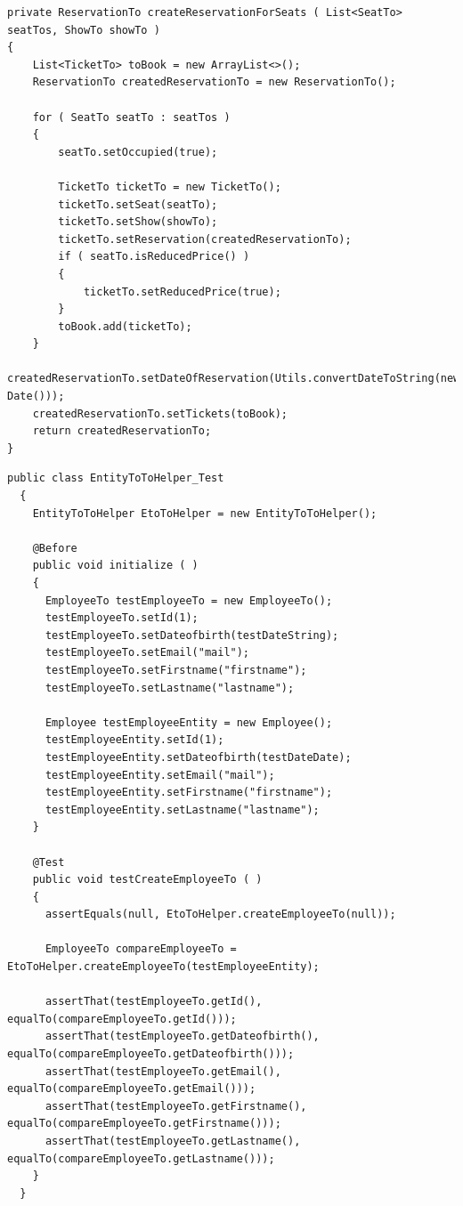 \begin{minipage}{\linewidth}
\begin{lstlisting}[style=lstJava]
private ReservationTo createReservationForSeats ( List<SeatTo> seatTos, ShowTo showTo )
{
	List<TicketTo> toBook = new ArrayList<>();
	ReservationTo createdReservationTo = new ReservationTo();
		
	for ( SeatTo seatTo : seatTos )
	{
		seatTo.setOccupied(true);
	
		TicketTo ticketTo = new TicketTo();
		ticketTo.setSeat(seatTo);
		ticketTo.setShow(showTo);
		ticketTo.setReservation(createdReservationTo);
		if ( seatTo.isReducedPrice() )
		{
			ticketTo.setReducedPrice(true);
		}
		toBook.add(ticketTo);
	}
	createdReservationTo.setDateOfReservation(Utils.convertDateToString(new Date()));
	createdReservationTo.setTickets(toBook);
	return createdReservationTo;
}
	\end{lstlisting}
	\label{lst:Anhang_Erstellen_Reservierung}
\end{minipage}

\begin{minipage}{\linewidth}
  \begin{lstlisting}[style=lstJava]
  public class EntityToToHelper_Test
  {
    EntityToToHelper EtoToHelper = new EntityToToHelper();

    @Before
    public void initialize ( )
    {
      EmployeeTo testEmployeeTo = new EmployeeTo();
      testEmployeeTo.setId(1);
      testEmployeeTo.setDateofbirth(testDateString);
      testEmployeeTo.setEmail("mail");
      testEmployeeTo.setFirstname("firstname");
      testEmployeeTo.setLastname("lastname");

      Employee testEmployeeEntity = new Employee();
      testEmployeeEntity.setId(1);
      testEmployeeEntity.setDateofbirth(testDateDate);
      testEmployeeEntity.setEmail("mail");
      testEmployeeEntity.setFirstname("firstname");
      testEmployeeEntity.setLastname("lastname");
    }

    @Test
    public void testCreateEmployeeTo ( )
    {
      assertEquals(null, EtoToHelper.createEmployeeTo(null));

      EmployeeTo compareEmployeeTo = EtoToHelper.createEmployeeTo(testEmployeeEntity);

      assertThat(testEmployeeTo.getId(), equalTo(compareEmployeeTo.getId()));
      assertThat(testEmployeeTo.getDateofbirth(), equalTo(compareEmployeeTo.getDateofbirth()));
      assertThat(testEmployeeTo.getEmail(), equalTo(compareEmployeeTo.getEmail()));
      assertThat(testEmployeeTo.getFirstname(), equalTo(compareEmployeeTo.getFirstname()));
      assertThat(testEmployeeTo.getLastname(), equalTo(compareEmployeeTo.getLastname()));
    }
  }

	\end{lstlisting}
  \label{src:entitytotohelpertest}
\end{minipage}